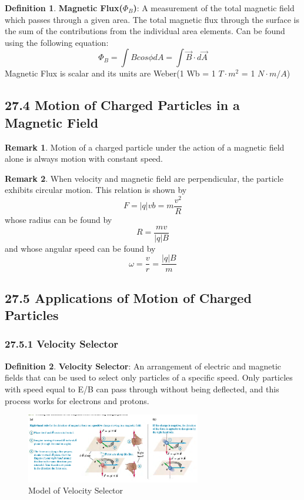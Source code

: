\documentclass[12pt]{amsart}
\theoremstyle{definition}
\newtheorem{definition}{Definition} %
\newtheorem*{remark}{Remark}        %
\numberwithin{equation}{theorem}    %
\begin{document}
\begin{definition}
    \textbf{Magnetic Flux($\Phi_B$)}:
    A measurement of the total magnetic field which passes through a given area. The total magnetic flux through the surface is the sum of the contributions from the individual area elements. Can be found using the following equation:
    $$\Phi_B = \int B cos\phi dA = \int\vec{B}\cdot d \vec{A}$$
    Magnetic Flux is scalar and its units are Weber(1 Wb = 1 $T\cdot m^2$ = 1 $N\cdot m/A$)

\end{definition}

\subsection*{27.4 Motion of Charged Particles in a Magnetic Field}

\begin{remark}
    Motion of a charged particle under the action of a magnetic field alone is always motion with constant speed.
\end{remark}

\begin{remark}
    When velocity and magnetic field are perpendicular, the particle exhibits circular motion. This relation is shown by $$F = |q|vb = m\frac{v^2}{R}$$ whose radius can be found by $$R = \frac{mv}{|q|B}$$ and whose angular speed can be found by $$\omega = \frac{v}{r} = \frac{|q|B}{m}$$
\end{remark}

\subsection*{27.5 Applications of Motion of Charged Particles}

\subsubsection*{27.5.1 Velocity Selector}

\begin{definition}
    \textbf{Velocity Selector}:
    An arrangement of electric and magnetic fields that can be used to select 
    only particles of a specific speed. Only particles with speed equal to 
    E/B can pass through without being deflected, and this process works for 
    electrons and protons.
\end{definition}

\begin{figure}[H]
    \centering
    \includegraphics[width=3in]{Media/RHR.png}
    \caption{Model of Velocity Selector}
    \label{Model of Velocity Selector}
\end{figure}
\end{document}
